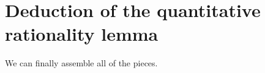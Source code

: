 \documentclass[11pt]{amsart}
\theoremstyle{definition}
\begin{document}


\section{Deduction of the quantitative rationality lemma}\label{s:maindeduction}
We can finally assemble all of the pieces.  %
\end{document}

